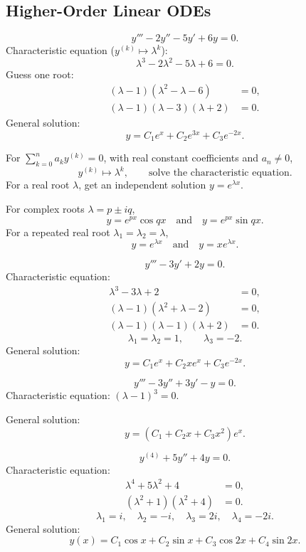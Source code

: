\subsection{Higher-Order Linear ODEs}

\begin{example}
  \[
    y'''-2y''-5y'+6y=0.
  \]
  Characteristic equation ($y^{(k)}\mapsto\lambda^k$):
  \[
    \lambda^3-2\lambda^2-5\lambda+6=0.
  \]
  Guess one root:
  \begin{align*}
    (\lambda-1)(\lambda^2-\lambda-6)  & =0, \\
    (\lambda-1)(\lambda-3)(\lambda+2) & =0.
  \end{align*}
  General solution:
  \[
    y=C_1e^x+C_2e^{3x}+C_3e^{-2x}.
  \]
\end{example}

For $\sum_{k=0}^n a_k y^{(k)}=0$, with real constant coefficients and $a_n\ne0$,
\[
  y^{(k)}\mapsto\lambda^k,\qquad\text{solve the characteristic equation.}
\]
For a real root $\lambda$, get an independent solution $y=e^{\lambda x}$.

For complex roots $\lambda=p\pm iq$,
\[
  y=e^{px}\cos qx\quad\text{and}\quad y=e^{px}\sin qx.
\]
For a repeated real root $\lambda_1=\lambda_2=\lambda$,
\[
  y=e^{\lambda x}\quad\text{and}\quad y=xe^{\lambda x}.
\]

\begin{example}
  \[
    y'''-3y'+2y=0.
  \]
  Characteristic equation:
  \begin{align*}
    \lambda^3-3\lambda+2              & =0, \\
    (\lambda-1)(\lambda^2+\lambda-2)  & =0, \\
    (\lambda-1)(\lambda-1)(\lambda+2) & =0.
  \end{align*}
  \[
    \lambda_1=\lambda_2=1,\qquad\lambda_3=-2.
  \]
  General solution:
  \[
    y=C_1e^x+C_2xe^x+C_3e^{-2x}.
  \]
\end{example}

\begin{example}
  \[
    y'''-3y''+3y'-y=0.
  \]
  Characteristic equation: $(\lambda-1)^3=0$.

  General solution:
  \[
    y=(C_1+C_2x+C_3x^2)e^x.
  \]
\end{example}

\begin{example}
  \[
    y^{(4)}+5y''+4y=0.
  \]
  Characteristic equation:
  \begin{align*}
    \lambda^4+5\lambda^2+4     & =0, \\
    (\lambda^2+1)(\lambda^2+4) & =0.
  \end{align*}
  \[
    \lambda_1=i,\quad\lambda_2=-i,\quad\lambda_3=2i,\quad\lambda_4=-2i.
  \]
  General solution:
  \[
    y(x)=C_1\cos x+C_2\sin x+C_3\cos2x+C_4\sin2x.
  \]
\end{example}

